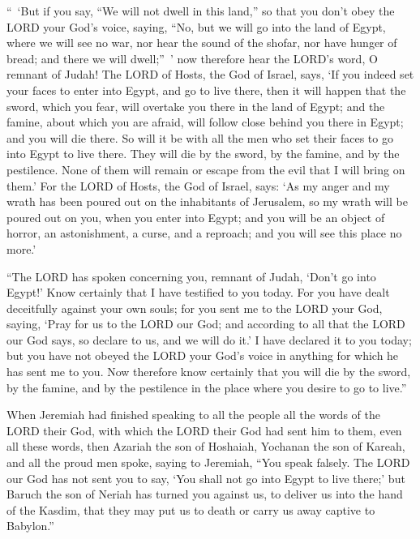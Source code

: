 \myverse{}“ ‘But if you say, “We will not dwell in this land,” so that you don’t obey the LORD your God’s voice, \myverse{}saying, “No, but we will go into the land of Egypt, where we will see no war, nor hear the sound of the shofar, nor have hunger of bread; and there we will dwell;” ’ \myverse{}now therefore hear the LORD’s word, O remnant of Judah! The LORD of Hosts, the God of Israel, says, ‘If you indeed set your faces to enter into Egypt, and go to live there, \myverse{}then it will happen that the sword, which you fear, will overtake you there in the land of Egypt; and the famine, about which you are afraid, will follow close behind you there in Egypt; and you will die there. \myverse{}So will it be with all the men who set their faces to go into Egypt to live there. They will die by the sword, by the famine, and by the pestilence. None of them will remain or escape from the evil that I will bring on them.’ \myverse{}For the LORD of Hosts, the God of Israel, says: ‘As my anger and my wrath has been poured out on the inhabitants of Jerusalem, so my wrath will be poured out on you, when you enter into Egypt; and you will be an object of horror, an astonishment, a curse, and a reproach; and you will see this place no more.’


\myverse{}“The LORD has spoken concerning you, remnant of Judah, ‘Don’t go into Egypt!’ Know certainly that I have testified to you today. \myverse{}For you have dealt deceitfully against your own souls; for you sent me to the LORD your God, saying, ‘Pray for us to the LORD our God; and according to all that the LORD our God says, so declare to us, and we will do it.’ \myverse{}I have declared it to you today; but you have not obeyed the LORD your God’s voice in anything for which he has sent me to you. \myverse{}Now therefore know certainly that you will die by the sword, by the famine, and by the pestilence in the place where you desire to go to live.”


\mychapter{} \myverse*{}When Jeremiah had finished speaking to all the people all the words of the LORD their God, with which the LORD their God had sent him to them, even all these words, \myverse{}then Azariah the son of Hoshaiah, Yochanan the son of Kareah, and all the proud men spoke, saying to Jeremiah, “You speak falsely. The LORD our God has not sent you to say, ‘You shall not go into Egypt to live there;’ \myverse{}but Baruch the son of Neriah has turned you against us, to deliver us into the hand of the Kasdim, that they may put us to death or carry us away captive to Babylon.”


